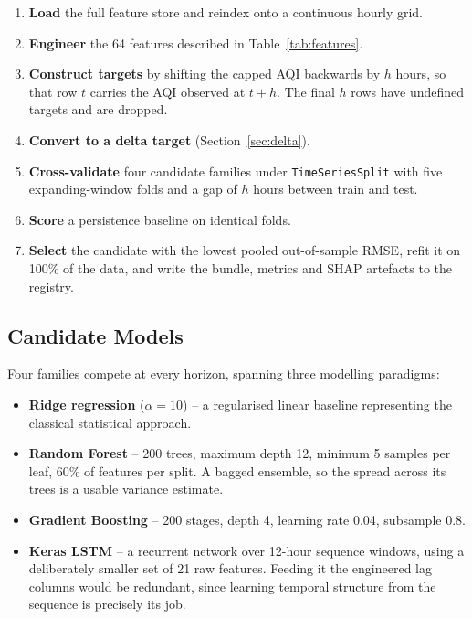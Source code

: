 \documentclass[11pt,a4paper]{article}
\begin{document}
\begin{enumerate}[itemsep=2pt]
  \item \textbf{Load} the full feature store and reindex onto a continuous
        hourly grid.
  \item \textbf{Engineer} the 64 features described in
        Table~\ref{tab:features}.
  \item \textbf{Construct targets} by shifting the capped AQI backwards by
        $h$ hours, so that row $t$ carries the AQI observed at $t+h$. The
        final $h$ rows have undefined targets and are dropped.
  \item \textbf{Convert to a delta target} (Section~\ref{sec:delta}).
  \item \textbf{Cross-validate} four candidate families under
        \texttt{TimeSeriesSplit} with five expanding-window folds and a gap of
        $h$ hours between train and test.
  \item \textbf{Score} a persistence baseline on identical folds.
  \item \textbf{Select} the candidate with the lowest pooled out-of-sample
        RMSE, refit it on 100\% of the data, and write the bundle, metrics and
        SHAP artefacts to the registry.
\end{enumerate}

\subsection{Candidate Models}

Four families compete at every horizon, spanning three modelling paradigms:

\begin{itemize}[itemsep=2pt]
  \item \textbf{Ridge regression} ($\alpha = 10$) -- a regularised linear
        baseline representing the classical statistical approach.
  \item \textbf{Random Forest} -- 200 trees, maximum depth 12, minimum 5
        samples per leaf, 60\% of features per split. A bagged ensemble, so
        the spread across its trees is a usable variance estimate.
  \item \textbf{Gradient Boosting} -- 200 stages, depth 4, learning rate
        0.04, subsample 0.8.
  \item \textbf{Keras LSTM} -- a recurrent network over 12-hour sequence
        windows, using a deliberately smaller set of 21 raw features. Feeding
        it the engineered lag columns would be redundant, since learning
        temporal structure from the sequence is precisely its job.
\end{itemize}
\end{document}
